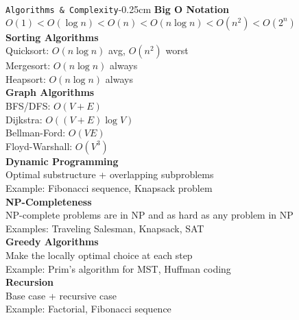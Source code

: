 \documentclass[10pt,3col]{cheatsheet}
\begin{document}
\begin{multicols}{3}
\begin{cheatsheetbox}{\texttt{Algorithms \& Complexity}}{-0.25cm}
    \textbf{Big O Notation}\\
    $O(1) < O(\log n) < O(n) < O(n \log n) < O(n^2) < O(2^n)$\\
    \textbf{Sorting Algorithms}\\
    Quicksort: $O(n \log n)$ avg, $O(n^2)$ worst\\
    Mergesort: $O(n \log n)$ always\\
    Heapsort: $O(n \log n)$ always\\
    \textbf{Graph Algorithms}\\
    BFS/DFS: $O(V + E)$\\
    Dijkstra: $O((V + E) \log V)$\\
    Bellman-Ford: $O(VE)$\\
    Floyd-Warshall: $O(V^3)$\\
    \textbf{Dynamic Programming}\\
    Optimal substructure + overlapping subproblems\\
    Example: Fibonacci sequence, Knapsack problem\\
    \textbf{NP-Completeness}\\
    NP-complete problems are in NP and as hard as any problem in NP\\
    Examples: Traveling Salesman, Knapsack, SAT\\
    \textbf{Greedy Algorithms}\\
    Make the locally optimal choice at each step\\
    Example: Prim's algorithm for MST, Huffman coding\\
    \textbf{Recursion}\\
    Base case + recursive case\\
    Example: Factorial, Fibonacci sequence
\end{cheatsheetbox}

\makecheatsheettitle


\end{multicols}
\end{document}
